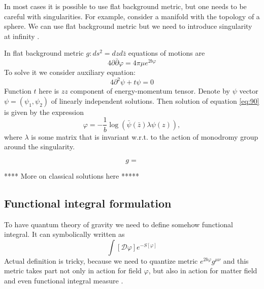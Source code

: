 \documentclass[12pt]{article}
\begin{document}
In most cases it is possible to use flat background metric, but one needs to be careful with
singularities. For example, consider a manifold with the topology of a sphere. We can use flat
background metric but we need to introduce singularity at infinity \cite{zamolodchikovlectures}. 

In flat background metric $g: ds^{2}=dz d\bar z$ equations of motions are
\begin{equation}
  \label{eq:90}
  4\partial\bar \partial \varphi = 4\pi\mu e^{2b\varphi}
\end{equation}
To solve it we consider auxiliary equation:
\begin{equation}
  \label{eq:91}
  4\partial^{2} \psi + t\psi=0
\end{equation}
Function $t$ here is $zz$ component of energy-momentum tensor. Denote by $\psi$  vector
$\psi=(\psi_{1},\psi_{2})$ of linearly independent solutions. Then solution of equation
\eqref{eq:90} is given by the expression
\begin{equation}
  \label{eq:92}
  \varphi=-\frac{1}{b} \log \left(\bar \psi(\bar z) \lambda \psi(z)\right),
\end{equation}
where $\lambda$ is some matrix that is invariant w.r.t. to the action of monodromy group around the
singularity. 

\begin{equation}
  \label{eq:89}
  g=
\end{equation}

**** More on classical solutions here *****

\subsection{Functional integral formulation}
\label{sec:funct-integr-form}

To have quantum theory of gravity we need to define somehow functional integral. It can symbolically
written as
\begin{equation}
  \label{eq:101}
  \int [\mathcal{D}\varphi] e^{-S[\varphi]}
\end{equation}
Actual definition is tricky, because we need to quantize metric $e^{2b\varphi}g^{\mu\nu}$ and this
metric takes part not only in action for field $\varphi$, but also in action for matter field and
even functional integral measure \cite{david1988conformal,distler1989conformal,polyakov1987gauge}. 
\end{document}
